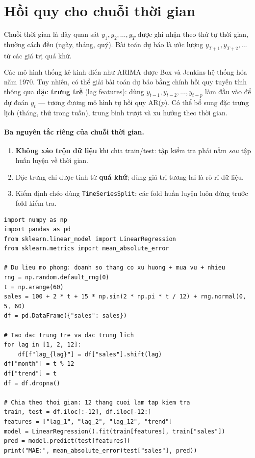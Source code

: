 \section{Hồi quy cho chuỗi thời gian}

\begin{definition}
Chuỗi thời gian là dãy quan sát $y_1, y_2, \dots, y_T$ được ghi nhận theo thứ tự thời gian, thường cách đều (ngày, tháng, quý). Bài toán dự báo là ước lượng $y_{T+1}, y_{T+2}, \dots$ từ các giá trị quá khứ.
\end{definition}

Các mô hình thống kê kinh điển như ARIMA được Box và Jenkins hệ thống hóa năm 1970. Tuy nhiên, có thể giải bài toán dự báo bằng chính hồi quy tuyến tính thông qua \textbf{đặc trưng trễ} (lag features): dùng $y_{t-1}, y_{t-2}, \dots, y_{t-p}$ làm đầu vào để dự đoán $y_t$ --- tương đương mô hình tự hồi quy AR($p$). Có thể bổ sung đặc trưng lịch (tháng, thứ trong tuần), trung bình trượt và xu hướng theo thời gian.

\paragraph{Ba nguyên tắc riêng của chuỗi thời gian.}
\begin{enumerate}
    \item \textbf{Không xáo trộn dữ liệu} khi chia train/test: tập kiểm tra phải nằm \textit{sau} tập huấn luyện về thời gian.
    \item Đặc trưng chỉ được tính từ \textbf{quá khứ}; dùng giá trị tương lai là rò rỉ dữ liệu.
    \item Kiểm định chéo dùng \texttt{TimeSeriesSplit}: các fold huấn luyện luôn đứng trước fold kiểm tra.
\end{enumerate}

\begin{lstlisting}[caption={Dự báo chuỗi thời gian bằng đặc trưng trễ}]
import numpy as np
import pandas as pd
from sklearn.linear_model import LinearRegression
from sklearn.metrics import mean_absolute_error

# Du lieu mo phong: doanh so thang co xu huong + mua vu + nhieu
rng = np.random.default_rng(0)
t = np.arange(60)
sales = 100 + 2 * t + 15 * np.sin(2 * np.pi * t / 12) + rng.normal(0, 5, 60)
df = pd.DataFrame({"sales": sales})

# Tao dac trung tre va dac trung lich
for lag in [1, 2, 12]:
    df[f"lag_{lag}"] = df["sales"].shift(lag)
df["month"] = t % 12
df["trend"] = t
df = df.dropna()

# Chia theo thoi gian: 12 thang cuoi lam tap kiem tra
train, test = df.iloc[:-12], df.iloc[-12:]
features = ["lag_1", "lag_2", "lag_12", "trend"]
model = LinearRegression().fit(train[features], train["sales"])
pred = model.predict(test[features])
print("MAE:", mean_absolute_error(test["sales"], pred))
\end{lstlisting}

